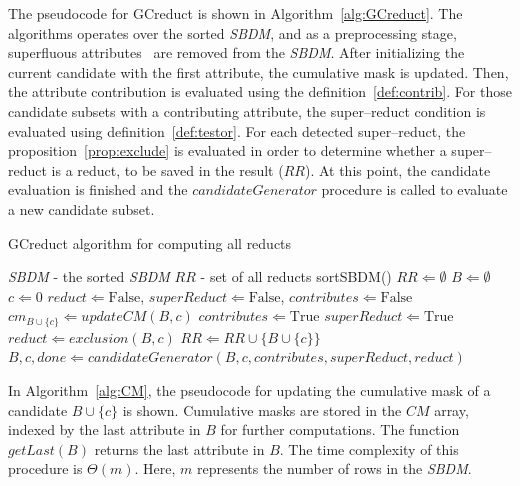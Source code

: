\documentclass[number,preprint,review,12pt]{elsarticle}
\begin{document}
	\label{superfluous}
	The pseudocode for GCreduct is shown in Algorithm~\ref{alg:GCreduct}. The algorithms operates over the sorted \textit{SBDM}, and as a preprocessing stage, superfluous attributes~\cite{Lazo-Cortes2013} are removed from the \textit{SBDM}. After initializing the current candidate with the first attribute, the cumulative mask is updated. Then, the attribute contribution is evaluated using the definition~\ref{def:contrib}. For those candidate subsets with a contributing attribute, the super--reduct condition is evaluated using definition~\ref{def:testor}. For each detected super--reduct, the proposition~\ref{prop:exclude} is evaluated in order to determine whether a super--reduct is a reduct, to be saved in the result ($RR$). At this point, the candidate evaluation is finished and the $candidateGenerator$ procedure is called to evaluate a new candidate subset.
	
	\begin{algorithm}
	\footnotesize
	\caption{GCreduct algorithm for computing all reducts}
	\label{alg:GCreduct}
	\begin{algorithmic}[1]
		\Require \textit{SBDM} - the sorted \textit{SBDM}
		\Ensure $RR$ - set of all reducts
		\State sortSBDM()
		\State $RR \Leftarrow \emptyset$
		\State $B \Leftarrow \emptyset$  
		\State $c \Leftarrow 0$ 
			\State $reduct \Leftarrow \mathrm{False}$, $superReduct \Leftarrow \mathrm{False}$, $contributes \Leftarrow \mathrm{False}$
		  	\State $cm_{B\cup \lbrace c\rbrace} \Leftarrow updateCM(B,c)$
		  	\label{line:contrib}
		  		\State $contributes \Leftarrow \mathrm{True}$
		  		\label{line:superReduct}
		  			\State $superReduct \Leftarrow \mathrm{True}$
		  			\State $reduct \Leftarrow exclusion(B,c)$
		  				\State $RR \Leftarrow RR \cup \lbrace B\cup \lbrace c\rbrace \rbrace$
		  			\EndIf
		  		\EndIf
		  	\EndIf
			\State $B,c,done \Leftarrow candidateGenerator(B,c,contributes,superReduct,reduct)$
	\EndWhile 
		\end{algorithmic}
	\end{algorithm}
	
	In Algorithm~\ref{alg:CM}, the pseudocode for updating the cumulative mask of a candidate $B\cup\lbrace c\rbrace$ is shown. Cumulative masks are stored in the $CM$ array, indexed by the last attribute in $B$ for further computations. The function $getLast(B)$ returns the last attribute in $B$. The time complexity of this procedure is $\Theta(m)$. Here, $m$ represents the number of rows in the \textit{SBDM}.
		
\end{document}
